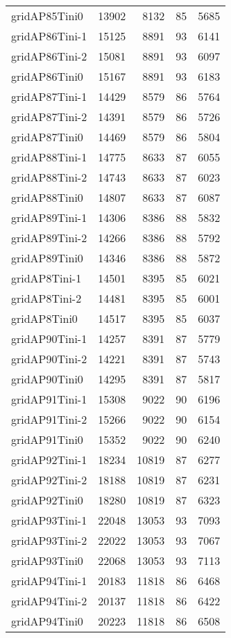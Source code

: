 \begin{longtable}{lrrrr}
gridAP85Tini0 & 13902 & 8132 & 85 & 5685 \\
gridAP86Tini-1 & 15125 & 8891 & 93 & 6141 \\
gridAP86Tini-2 & 15081 & 8891 & 93 & 6097 \\
gridAP86Tini0 & 15167 & 8891 & 93 & 6183 \\
gridAP87Tini-1 & 14429 & 8579 & 86 & 5764 \\
gridAP87Tini-2 & 14391 & 8579 & 86 & 5726 \\
gridAP87Tini0 & 14469 & 8579 & 86 & 5804 \\
gridAP88Tini-1 & 14775 & 8633 & 87 & 6055 \\
gridAP88Tini-2 & 14743 & 8633 & 87 & 6023 \\
gridAP88Tini0 & 14807 & 8633 & 87 & 6087 \\
gridAP89Tini-1 & 14306 & 8386 & 88 & 5832 \\
gridAP89Tini-2 & 14266 & 8386 & 88 & 5792 \\
gridAP89Tini0 & 14346 & 8386 & 88 & 5872 \\
gridAP8Tini-1 & 14501 & 8395 & 85 & 6021 \\
gridAP8Tini-2 & 14481 & 8395 & 85 & 6001 \\
gridAP8Tini0 & 14517 & 8395 & 85 & 6037 \\
gridAP90Tini-1 & 14257 & 8391 & 87 & 5779 \\
gridAP90Tini-2 & 14221 & 8391 & 87 & 5743 \\
gridAP90Tini0 & 14295 & 8391 & 87 & 5817 \\
gridAP91Tini-1 & 15308 & 9022 & 90 & 6196 \\
gridAP91Tini-2 & 15266 & 9022 & 90 & 6154 \\
gridAP91Tini0 & 15352 & 9022 & 90 & 6240 \\
gridAP92Tini-1 & 18234 & 10819 & 87 & 6277 \\
gridAP92Tini-2 & 18188 & 10819 & 87 & 6231 \\
gridAP92Tini0 & 18280 & 10819 & 87 & 6323 \\
gridAP93Tini-1 & 22048 & 13053 & 93 & 7093 \\
gridAP93Tini-2 & 22022 & 13053 & 93 & 7067 \\
gridAP93Tini0 & 22068 & 13053 & 93 & 7113 \\
gridAP94Tini-1 & 20183 & 11818 & 86 & 6468 \\
gridAP94Tini-2 & 20137 & 11818 & 86 & 6422 \\
gridAP94Tini0 & 20223 & 11818 & 86 & 6508 \\

\end{longtable}
